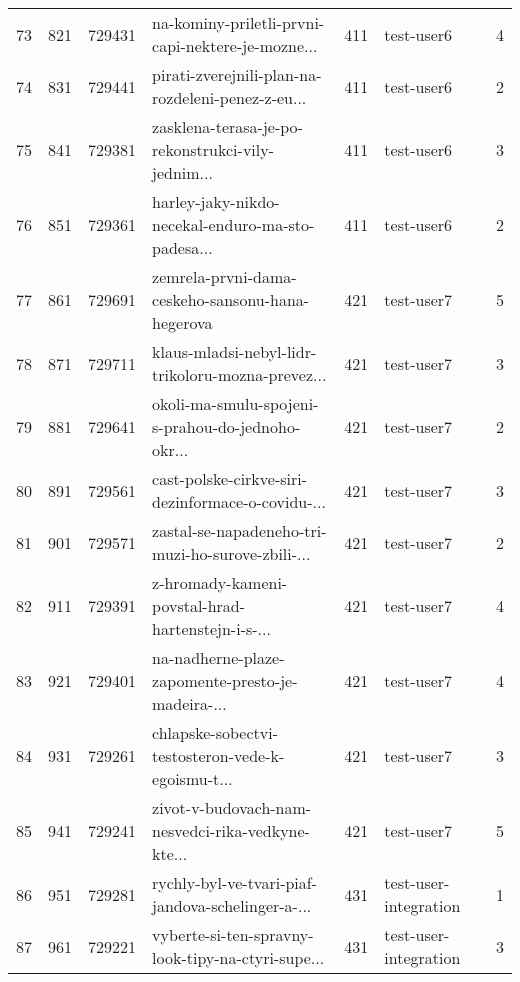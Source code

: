 \begin{tabular}{lrrlrlr}
73   &        821 &   729431 &  na-kominy-priletli-prvni-capi-nektere-je-mozne... &      411 &                   test-user6 &               4 \\
74   &        831 &   729441 &  pirati-zverejnili-plan-na-rozdeleni-penez-z-eu... &      411 &                   test-user6 &               2 \\
75   &        841 &   729381 &  zasklena-terasa-je-po-rekonstrukci-vily-jednim... &      411 &                   test-user6 &               3 \\
76   &        851 &   729361 &  harley-jaky-nikdo-necekal-enduro-ma-sto-padesa... &      411 &                   test-user6 &               2 \\
77   &        861 &   729691 &   zemrela-prvni-dama-ceskeho-sansonu-hana-hegerova &      421 &                   test-user7 &               5 \\
78   &        871 &   729711 &  klaus-mladsi-nebyl-lidr-trikoloru-mozna-prevez... &      421 &                   test-user7 &               3 \\
79   &        881 &   729641 &  okoli-ma-smulu-spojeni-s-prahou-do-jednoho-okr... &      421 &                   test-user7 &               2 \\
80   &        891 &   729561 &  cast-polske-cirkve-siri-dezinformace-o-covidu-... &      421 &                   test-user7 &               3 \\
81   &        901 &   729571 &  zastal-se-napadeneho-tri-muzi-ho-surove-zbili-... &      421 &                   test-user7 &               2 \\
82   &        911 &   729391 &  z-hromady-kameni-povstal-hrad-hartenstejn-i-s-... &      421 &                   test-user7 &               4 \\
83   &        921 &   729401 &  na-nadherne-plaze-zapomente-presto-je-madeira-... &      421 &                   test-user7 &               4 \\
84   &        931 &   729261 &  chlapske-sobectvi-testosteron-vede-k-egoismu-t... &      421 &                   test-user7 &               3 \\
85   &        941 &   729241 &  zivot-v-budovach-nam-nesvedci-rika-vedkyne-kte... &      421 &                   test-user7 &               5 \\
86   &        951 &   729281 &  rychly-byl-ve-tvari-piaf-jandova-schelinger-a-... &      431 &        test-user-integration &               1 \\
87   &        961 &   729221 &  vyberte-si-ten-spravny-look-tipy-na-ctyri-supe... &      431 &        test-user-integration &               3 \\

\end{tabular}
